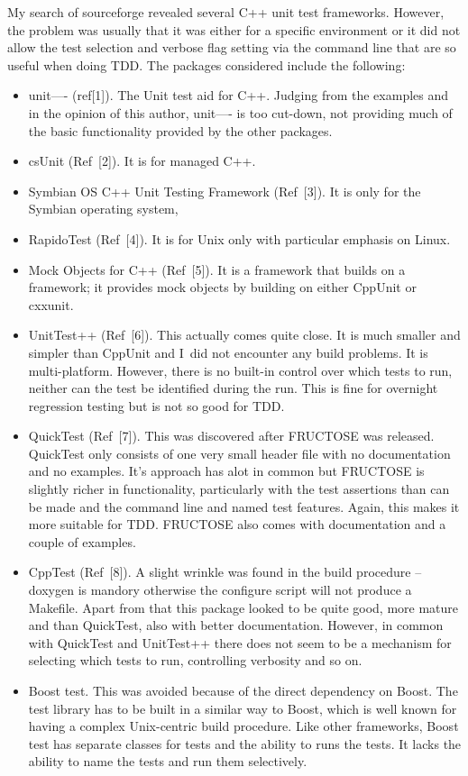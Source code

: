 \documentclass{book}
\begin{document}
My search of sourceforge revealed several C++ unit test
frameworks. However, the problem was usually that it was
either for a specific environment or it did not allow the 
test selection and verbose flag setting via the command line
that are so useful when doing TDD.
The packages considered include the following:
\begin{itemize}
\item unit---- (ref[1]).
The Unit test aid for C++.
Judging from the examples and in the opinion of this author, unit----
is too cut-down, not providing much of the basic functionality
provided by the other packages.

\item csUnit (Ref~[2]). It is for managed C++.

\item Symbian OS C++ Unit Testing Framework (Ref~[3]).
It is only for the Symbian operating system,

\item RapidoTest (Ref~[4]).
It is for Unix only with particular emphasis on Linux.

\item Mock Objects for C++ (Ref~[5]).
It is a framework that builds on a framework; it 
provides mock objects by building on either CppUnit or cxxunit.

\item UnitTest++ (Ref~[6]).
This actually comes quite close.
It is much smaller and simpler than CppUnit and I~did not
encounter any build problems. It is multi-platform.
However, there is no built-in control over which tests
to run, neither can the test be identified during the run.
This is fine for overnight regression testing but is not
so good for TDD.

\item QuickTest (Ref~[7]).
This was discovered after FRUCTOSE was released.
QuickTest only consists of one very small header file with
no documentation and no examples.
It's approach has alot in common but FRUCTOSE is slightly 
richer in functionality,
particularly with the test assertions than can be made and the
command line and named test features. 
Again, this makes it more suitable for TDD.
FRUCTOSE also comes with documentation and a couple of examples.

\item CppTest (Ref~[8]).
A slight wrinkle was found in the build procedure -- doxygen is mandory
otherwise the configure script will not produce a Makefile.
Apart from that this package looked to be quite good, more mature
and than QuickTest, also with better documentation.
However, in common with QuickTest and UnitTest++ there does not
seem to be a mechanism for selecting which tests to run,
controlling verbosity and so on.

\item Boost test.
This was avoided because of the direct dependency on Boost.
The test library has to be built in a similar way to Boost,
which is well known for having a complex Unix-centric build procedure.
Like other frameworks, Boost test has separate classes for tests
and the ability to runs the tests. It lacks the ability to name the
tests and run them selectively.
\end{itemize}
\end{document}
